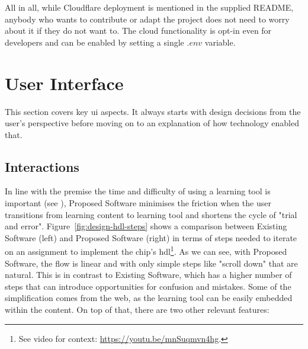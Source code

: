All in all, while Cloudflare deployment is mentioned in the supplied README, anybody who wants to contribute or adapt the project does not need to worry about it if they do not want to.
The cloud functionality is opt-in even for developers and can be enabled by setting a single $.env$ variable.

\section{User Interface}

This section covers key \gls{ui} aspects.
It always starts with design decisions from the user's perspective before moving on to an explanation of how technology enabled that.

\subsection{Interactions}
\label{sec:ui-interactions}

In line with the premise the time and difficulty of using a learning tool is important (see ), Proposed Software minimises the friction when the user transitions from learning content to learning tool and shortens the cycle of "trial and error".
Figure~\ref{fig:design-hdl-steps} shows a comparison between Existing Software (left) and Proposed Software (right) in terms of steps needed to iterate on an assignment to implement the chip's \gls{hdl}\footnote{See video for context: \url{https://youtu.be/mnSuqmvn4hg}.}.
As we can see, with Proposed Software, the flow is linear and with only simple steps like "scroll down" that are natural.
This is in contrast to Existing Software, which has a higher number of steps that can introduce opportunities for confusion and mistakes.
Some of the simplification comes from the web, as the learning tool can be easily embedded within the content.
On top of that, there are two other relevant features:


